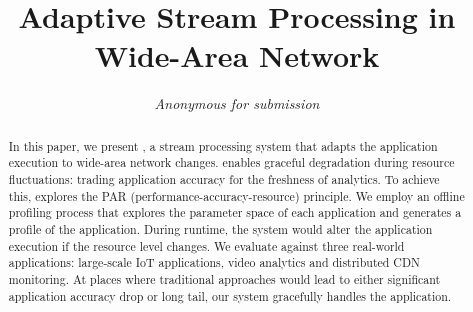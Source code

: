 \documentclass{sig-alternate-10pt}
\begin{document}



\title{Adaptive Stream Processing in Wide-Area Network}

\author{ \alignauthor \textit{Anonymous for submission} }

\maketitle

\begin{abstract}
  In this paper, we present \sysname{}, a stream processing system that adapts
  the application execution to wide-area network changes. \sysname{} enables
  graceful degradation during resource fluctuations: trading application
  accuracy for the freshness of analytics. To achieve this, \sysname{} explores
  the PAR (performance-accuracy-resource) principle. We employ an offline
  profiling process that explores the parameter space of each application and
  generates a profile of the application. During runtime, the system would alter
  the application execution if the resource level changes. We evaluate
  \sysname{} against three real-world applications: large-scale IoT
  applications, video analytics and distributed CDN monitoring. At places where
  traditional approaches would lead to either significant application accuracy
  drop or long tail, our system gracefully handles the application.
\end{abstract}










{}
\end{document}
